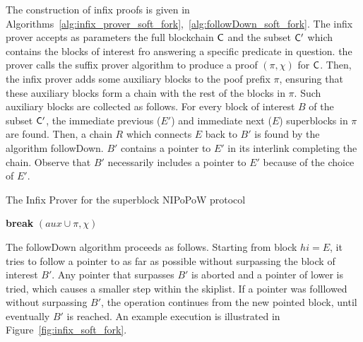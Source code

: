 The construction of infix proofs is given in Algorithms~\ref{alg:infix_prover_soft_fork},~\ref{alg:followDown_soft_fork}. The infix prover accepts as parameters the full blockchain $\mathsf{C}$ and the subset $\mathsf{C}'$ which contains the blocks of interest fro answering a specific predicate in question. the prover calls the suffix prover algorithm to produce a proof $(\pi, \chi)$ for $\mathsf{C}$. Then, the infix prover adds some auxiliary blocks to the poof prefix $\pi$, ensuring that these auxiliary blocks form a chain with the rest of the blocks in $\pi$. Such auxiliary blocks are collected as follows. For every block of interest $B$ of the subset $\mathsf{C}'$, the immediate previous ($E'$) and immediate next ($E$) superblocks in $\pi$ are found. Then, a chain $R$ which connects $E$ back to $B'$ is found by the algorithm \textsf{followDown}. $B'$ contains a pointer to $E'$ in its interlink completing the chain. Observe that $B'$ necessarily includes a pointer to $E'$ because of the choice of $E'$.

\begin{algorithm}[h!]
	\caption{\label{alg:infix_prover_soft_fork}The Infix Prover for the superblock NIPoPoW protocol~\cite{nipopows}}
	\begin{algorithmic}[1]
                      \textbf{break}
                  \EndIf
              \EndFor
          \EndFor
          \State\Return $(aux \cup \pi, \chi)$
      \EndFunction
	\end{algorithmic}
\end{algorithm}

The \textsf{followDown} algorithm proceeds as follows. Starting from block $hi = E$, it tries to follow a pointer to as far as possible without surpassing the block of interest $B'$. Any pointer that surpasses $B'$ is aborted and a pointer of lower is tried, which causes a smaller step within the skiplist. If a pointer was folllowed without surpassing $B'$, the operation continues from the new pointed block, until eventually $B'$ is reached. An example execution is illustrated in Figure~\ref{fig:infix_soft_fork}.

